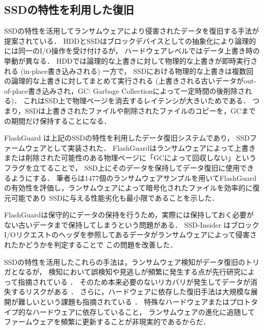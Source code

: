 \subsection{SSDの特性を利用した復旧}
\label{subsec:ssd-recovery}
SSDの特性を活用してランサムウェアにより侵害されたデータを復旧する手法が提案されている．
HDDとSSDはブロックデバイスとしての抽象化により論理的には同一のI/O操作を受け付けるが，
ハードウェアレベルではデータ上書き時の挙動が異なる．
HDDでは論理的な上書きに対して物理的な上書きが即時実行される (in-place書き込みされる) 一方で，
SSDにおける物理的な上書きは複数回の論理的な上書きに対してまとめて実行される
(上書きされる古いデータがout-of-place書き込みされ，GC: Garbage Collectionによって一定時間の後削除される)．
これはSSD上で物理ページを消去するレイテンシが大きいためである．
つまり，SSDは上書きされたファイルや削除されたファイルのコピーを，GCまでの期間だけ保持することになる．

FlashGuard \cite{huang2017flashguard} は上記のSSDの特性を利用したデータ復旧システムであり，
SSDファームウェアとして実装された．
FlashGuardはランサムウェアによって上書きまたは削除された可能性のある物理ページに「GCによって回収しない」というフラグを立てることで，
SSD上にそのデータを保持してデータ復旧に使用できるようにする．
筆者らは1477個のランサムウェアサンプルを用いてFlashGuardの有効性を評価し，ランサムウェアによって暗号化されたファイルを効率的に復元可能であり
SSDに与える性能劣化も最小限であることを示した．

FlashGuardは保守的にデータの保持を行うため，実際には保持しておく必要がない古いデータまで保持してしまうという問題がある．
SSD-Insider \cite{baek2018ssd} はブロックI/Oリクエストのヘッダを参照してあるデータがランサムウェアによって侵害されたかどうかを判定することで
この問題を改善した．

SSDの特性を活用したこれらの手法は，ランサムウェア検知がデータ復旧のトリガとなるが，
検知において誤検知や見逃しが頻繁に発生する点が先行研究によって指摘されている \cite{han2020effectiveness}．
そのため本来必要のないリカバリが発生してデータが消失するリスクがある \cite{css2024-enomoto}．
さらに，ハードウェアに依存した復旧手法は大規模な展開が難しいという課題も指摘されている \cite{wang2024ransom}．
特殊なハードウェアまたはプロトタイプ的なハードウェアに依存していること，
ランサムウェアの進化に追随してファームウェアを頻繁に更新することが非現実的であるからだ．

